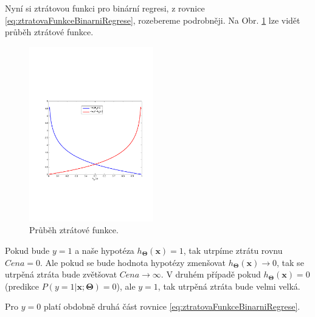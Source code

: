 \newpage

\par{Nyní si ztrátovou funkci pro binární regresi, z rovnice \ref{eq:ztratovaFunkceBinarniRegrese}, rozebereme podrobněji. Na Obr. \ref{fig:ztratovaFunkce3} lze vidět průběh ztrátové funkce.
\begin{figure}[!ht]
	\centering
	\includegraphics[width = 0.48\textwidth, trim = 2.5cm 7cm 2cm 9cm]{./Img/BinarniRegrese/ztratovaFunkce/ztratovaFunkce3.pdf}
	\caption{Průběh ztrátové funkce.}
	\label{fig:ztratovaFunkce3}
\end{figure}}

\par{Pokud bude $y = 1$ a naše hypotéza $h_{\bm{\Theta}} \left( \bm{x} \right) = 1$, tak utrpíme ztrátu rovnu $Cena = 0$. Ale pokud se bude hodnota hypotézy zmenšovat $h_{\bm{\Theta}} \left( \bm{x} \right) \rightarrow 0$, tak se utrpěná ztráta bude zvětšovat $Cena \rightarrow \infty$. V druhém případě pokud $h_{\bm{\Theta}} \left( \bm{x} \right) = 0$ (predikce $P \left( y = 1 | \bm{x}; \bm{\Theta} \right) = 0$), ale $y = 1$, tak utrpěná ztráta bude velmi velká.}

\par{Pro $y = 0$ platí obdobně druhá část rovnice \ref{eq:ztratovaFunkceBinarniRegrese}.}




\newpage
















